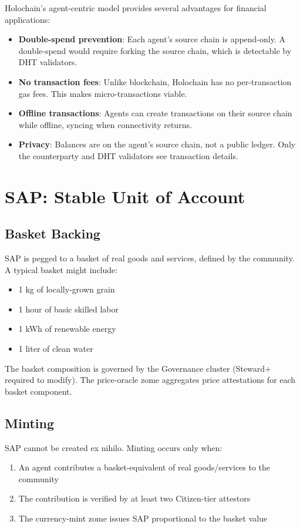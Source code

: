 \documentclass[11pt,twocolumn]{article}
\begin{document}
Holochain's agent-centric model provides several advantages for financial
applications:

\begin{itemize}[nosep]
  \item \textbf{Double-spend prevention}: Each agent's source chain is
    append-only. A double-spend would require forking the source chain,
    which is detectable by DHT validators.
  \item \textbf{No transaction fees}: Unlike blockchain, Holochain has no
    per-transaction gas fees. This makes micro-transactions viable.
  \item \textbf{Offline transactions}: Agents can create transactions on
    their source chain while offline, syncing when connectivity returns.
  \item \textbf{Privacy}: Balances are on the agent's source chain, not a
    public ledger. Only the counterparty and DHT validators see transaction
    details.
\end{itemize}

\section{SAP: Stable Unit of Account}

\subsection{Basket Backing}

SAP is pegged to a basket of real goods and services, defined by the community.
A typical basket might include:

\begin{itemize}[nosep]
  \item 1 kg of locally-grown grain
  \item 1 hour of basic skilled labor
  \item 1 kWh of renewable energy
  \item 1 liter of clean water
\end{itemize}

The basket composition is governed by the Governance cluster (Steward+
required to modify). The price-oracle zome aggregates price attestations
for each basket component.

\subsection{Minting}

SAP cannot be created ex nihilo. Minting occurs only when:
\begin{enumerate}[nosep]
  \item An agent contributes a basket-equivalent of real goods/services
    to the community
  \item The contribution is verified by at least two Citizen-tier attestors
  \item The currency-mint zome issues SAP proportional to the basket value
\end{enumerate}
\end{document}
